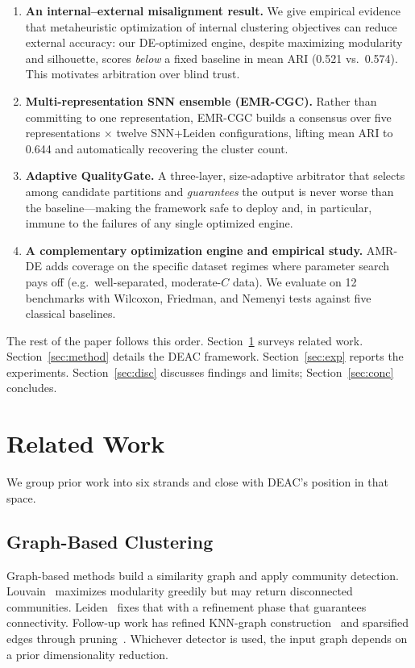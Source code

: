 \documentclass[journal]{IEEEtran}
\begin{document}
\begin{enumerate}
\item \textbf{An internal--external misalignment result.} We give empirical
evidence that metaheuristic optimization of internal clustering objectives
can reduce external accuracy: our DE-optimized engine, despite maximizing
modularity and silhouette, scores \emph{below} a fixed baseline in mean ARI
(0.521 vs.\ 0.574). This motivates arbitration over blind trust.

\item \textbf{Multi-representation SNN ensemble (EMR-CGC).} Rather than
committing to one representation, EMR-CGC builds a consensus over five
representations $\times$ twelve SNN+Leiden configurations, lifting mean ARI
to 0.644 and automatically recovering the cluster count.

\item \textbf{Adaptive QualityGate.} A three-layer, size-adaptive arbitrator
that selects among candidate partitions and \emph{guarantees} the output is
never worse than the baseline---making the framework safe to deploy and, in
particular, immune to the failures of any single optimized engine.

\item \textbf{A complementary optimization engine and empirical study.}
AMR-DE adds coverage on the specific dataset regimes where parameter search
pays off (e.g.\ well-separated, moderate-$C$ data). We evaluate on 12
benchmarks with Wilcoxon, Friedman, and Nemenyi tests against five classical
baselines.
\end{enumerate}

The rest of the paper follows this order. Section~\ref{sec:related} surveys related work. Section~\ref{sec:method} details the DEAC framework. Section~\ref{sec:exp} reports the experiments. Section~\ref{sec:disc} discusses findings and limits; Section~\ref{sec:conc} concludes.

\section{Related Work}\label{sec:related}

We group prior work into six strands and close with DEAC's position in that space.

\subsection{Graph-Based Clustering}
Graph-based methods build a similarity graph and apply community detection. Louvain~\cite{blondel2008fast} maximizes modularity greedily but may return disconnected communities. Leiden~\cite{traag2019louvain} fixes that with a refinement phase that guarantees connectivity. Follow-up work has refined KNN-graph construction~\cite{brito1997connectivity} and sparsified edges through pruning~\cite{satuluri2011local}. Whichever detector is used, the input graph depends on a prior dimensionality reduction.
\end{document}
